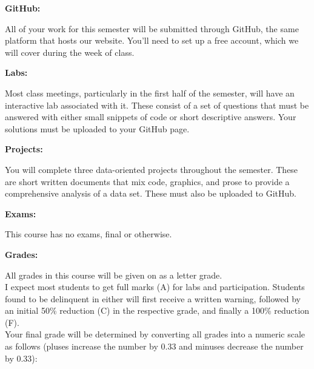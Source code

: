 \documentclass[12pt]{article}
\begin{document}
\vspace{0.4cm}

\textbf{GitHub:} \vspace{6pt}

All of your work for this semester will be submitted through GitHub,
the same platform that hosts our website. You'll need to set up a free
account, which we will cover during the week of class.

\vspace{0.4cm}

\textbf{Labs:} \vspace{6pt}

Most class meetings, particularly in the first half of the semester,
will have an interactive lab associated with it. These consist of a
set of questions that must be answered with either small snippets of
code or short descriptive answers. Your solutions must be uploaded
to your GitHub page.

\vspace{0.4cm}

\textbf{Projects:} \vspace{6pt}

You will complete three data-oriented projects throughout
the semester. These are short written documents that mix code,
graphics, and prose to provide a comprehensive analysis of a
data set.  These must also be uploaded to GitHub.

\vspace{0.4cm}

\textbf{Exams:} \vspace{6pt}

This course has no exams, final or otherwise.

\vspace{0.4cm}

\textbf{Grades:} \vspace{6pt}

All grades in this course will be given on as a letter grade. \\

I expect most students to get full marks (A) for labs and participation.
Students found to be delinquent in either will first receive a written
warning, followed by an initial 50\% reduction (C) in the respective grade,
and finally a 100\% reduction (F). \\

Your final grade will be determined by converting all grades into
a numeric scale as follows (pluses increase the number by 0.33 and minuses
decrease the number by 0.33):
\end{document}

